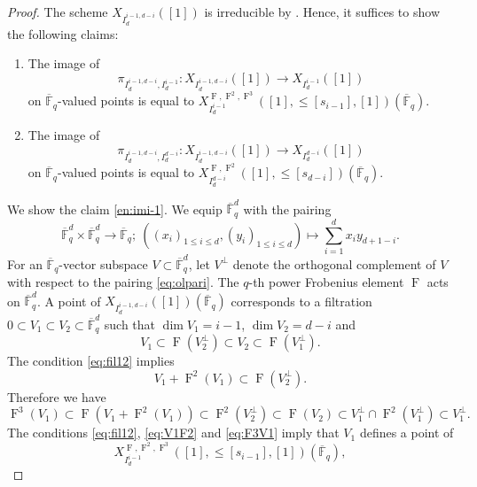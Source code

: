 \documentclass[12pt,a4paper]{article}
\DeclareMathOperator{\oF}{F}
\newcommand{\bF}{\mathbb{F}}
\newcommand{\ol}{\overline}
\begin{document}
\begin{proof}
The scheme $X_{I_{d}^{i-1,d-i}}([1])$ 
is irreducible by \cite[Theorem 1]{BoRoIrrDL}. 
Hence, it suffices to show the following claims: 
\begin{enumerate}
\item \label{en:imi-1}
The image of 
\[
 \pi_{I_{d}^{i-1,d-i},I_{d}^{i-1}} \colon 
 X_{I_{d}^{i-1,d-i}}([1]) \to X_{I_{d}^{i-1}}([1])
\]
on $\ol{\bF}_{q}$-valued points is equal to 
$X_{I_{d}^{i-1}}^{\oF,\oF^2,\oF^3}([1],{\leq}[s_{i-1}],[1])(\ol{\bF}_{q})$.
\item \label{en:imd-i}
The image of 
\[
 \pi_{I_{d}^{i-1,d-i},I_{d}^{d-i}} \colon 
 X_{I_{d}^{i-1,d-i}}([1]) \to X_{I_{d}^{d-i}}([1])
\]
on $\ol{\bF}_{q}$-valued points is equal to  $X_{I_{d}^{d-i}}^{\oF,\oF^2}([1],{\leq}[s_{d-i}])(\ol{\bF}_{q})$. 
\end{enumerate}
We show the claim \ref{en:imi-1}. 
We equip $\ol{\bF}_{q}^d$ with the pairing 
\begin{equation}\label{eq:olpari}
 \ol{\bF}_q^d \times \ol{\bF}_q^d \to \ol{\bF}_q;\ 
 ((x_i)_{1 \leq i \leq d},(y_i)_{1 \leq i \leq d}) 
 \mapsto \sum_{i=1}^d x_i y_{d+1-i} .     
\end{equation}
For an $\ol{\bF}_q$-vector subspace 
$V \subset \ol{\bF}_q^d$, let 
$V^{\perp}$ denote the orthogonal complement of $V$ with respect to the pairing \eqref{eq:olpari}. 
The $q$-th power Frobenius element $\oF$ acts on 
$\ol{\bF}_{q}^d$. 
A point of $X_{I_{d}^{i-1,d-i}}([1])(\ol{\bF}_q)$ 
corresponds to a filtration 
$0 \subset V_1 \subset V_2 \subset \ol{\bF}_{q}^d$ 
such that $\dim V_1 =i-1$, $\dim V_2 =d-i$ 
and 
\begin{equation}\label{eq:fil12}
 V_1 \subset \oF (V_2^{\perp}) \subset V_2 \subset \oF (V_1^{\perp}). 
\end{equation}
The condition \eqref{eq:fil12} implies 
\begin{equation}\label{eq:V1F2}
 V_1 +\oF^2(V_1) \subset \oF (V_2^{\perp}). 
\end{equation}
Therefore we have 
\begin{equation}\label{eq:F3V1}
 \oF^3(V_1) \subset \oF (V_1 +\oF^2(V_1)) \subset \oF^2(V_2^{\perp}) \subset 
 \oF (V_2) \subset V_1^{\perp} \cap \oF^2(V_1^{\perp}) \subset V_1^{\perp}. 
\end{equation}
The conditions 
\eqref{eq:fil12}, \eqref{eq:V1F2} 
and \eqref{eq:F3V1} imply that 
$V_1$ defines a point of 
\begin{equation*}\label{eq:ptXF123}
 X_{I_{d}^{i-1}}^{\oF,\oF^2,\oF^3}([1],{\leq}[s_{i-1}],[1])(\ol{\bF}_{q}), 

\end{equation*}
\end{proof}
\end{document}
